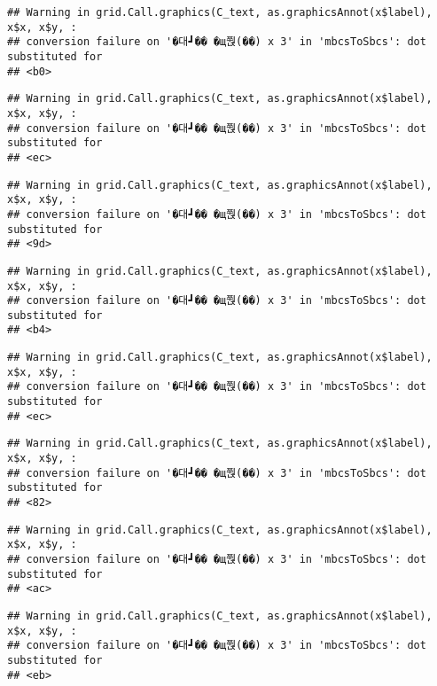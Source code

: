 \documentclass[
]{article}
\begin{document}
\begin{verbatim}
## Warning in grid.Call.graphics(C_text, as.graphicsAnnot(x$label), x$x, x$y, :
## conversion failure on '�대┛�� �щ쭩(��) x 3' in 'mbcsToSbcs': dot substituted for
## <b0>
\end{verbatim}

\begin{verbatim}
## Warning in grid.Call.graphics(C_text, as.graphicsAnnot(x$label), x$x, x$y, :
## conversion failure on '�대┛�� �щ쭩(��) x 3' in 'mbcsToSbcs': dot substituted for
## <ec>
\end{verbatim}

\begin{verbatim}
## Warning in grid.Call.graphics(C_text, as.graphicsAnnot(x$label), x$x, x$y, :
## conversion failure on '�대┛�� �щ쭩(��) x 3' in 'mbcsToSbcs': dot substituted for
## <9d>
\end{verbatim}

\begin{verbatim}
## Warning in grid.Call.graphics(C_text, as.graphicsAnnot(x$label), x$x, x$y, :
## conversion failure on '�대┛�� �щ쭩(��) x 3' in 'mbcsToSbcs': dot substituted for
## <b4>
\end{verbatim}

\begin{verbatim}
## Warning in grid.Call.graphics(C_text, as.graphicsAnnot(x$label), x$x, x$y, :
## conversion failure on '�대┛�� �щ쭩(��) x 3' in 'mbcsToSbcs': dot substituted for
## <ec>
\end{verbatim}

\begin{verbatim}
## Warning in grid.Call.graphics(C_text, as.graphicsAnnot(x$label), x$x, x$y, :
## conversion failure on '�대┛�� �щ쭩(��) x 3' in 'mbcsToSbcs': dot substituted for
## <82>
\end{verbatim}

\begin{verbatim}
## Warning in grid.Call.graphics(C_text, as.graphicsAnnot(x$label), x$x, x$y, :
## conversion failure on '�대┛�� �щ쭩(��) x 3' in 'mbcsToSbcs': dot substituted for
## <ac>
\end{verbatim}

\begin{verbatim}
## Warning in grid.Call.graphics(C_text, as.graphicsAnnot(x$label), x$x, x$y, :
## conversion failure on '�대┛�� �щ쭩(��) x 3' in 'mbcsToSbcs': dot substituted for
## <eb>
\end{verbatim}
\end{document}
